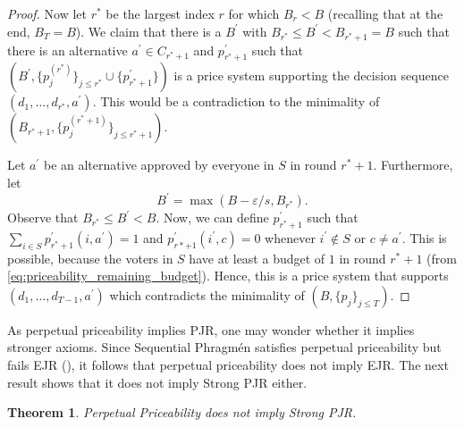 \documentclass[10pt]{scrartcl}
\theoremstyle{plain}
\newtheorem{theorem}{Theorem}[section]
\theoremstyle{definition}
\renewcommand*{\leq}{\leqslant}
\renewcommand{\epsilon}{\varepsilon}
\begin{document}
\begin{proof}
Now let $r^*$ be the largest index $r$ for which $B_r < B$ (recalling that at the end, $B_T = B$). We claim that there is a $B^{\prime}$ with $B_{r^*} \leq B^{\prime}<B_{r^*+1} = B$ such that there is an alternative $a^{\prime} \in C_{r^* + 1}$ and $p_{r^{*}+1}^{\prime}$ such that $ (B^{\prime}, \{p_j^{(r^*)} \}_{j \leq r^*} \cup \{p_{r^* + 1}^{\prime} \}) $ is a price system supporting the decision sequence $ (d_1, \ldots, d_{r^*}, a^{\prime} )$. This would be a contradiction to the minimality of $ (B_{r^* + 1}, \{p_j^{(r^* + 1)} \}_{j \leq r^*+1} )$.

Let $a^{\prime}$ be an alternative approved by everyone in $S$ in round $r^*+1$. Furthermore, let 
\[
 B^{\prime}= \max  (B - \epsilon / s, B_{r^*} ).
\]
Observe that $B_{r^*} \leq B^{\prime} < B$. 
Now, we can define $p_{r^* + 1}^{\prime}$ such that $\sum_{i \in S} p_{r^*+1}^{\prime} (i, a^{\prime} )=1$ and $p_{r *+1}^{\prime} (i^{\prime}, c )=0$ whenever $i^{\prime} \notin S$ or $c \neq a^{\prime}$. This is possible, because the voters in $S$ have at least a budget of $1$ in round $r^*+1$ (from  \eqref{eq:priceability_remaining_budget}). Hence, this is a price system that supports $ (d_1, \ldots, d_{T-1}, a^{\prime} )$ which contradicts the minimality of $ (B, \{p_j \}_{j \leq T} )$.
\end{proof}

As perpetual priceability implies PJR, one may wonder whether it implies stronger axioms. Since Sequential Phragm\'en satisfies perpetual priceability \citep{lacknermaly2023} but fails EJR (), it follows that perpetual priceability does not imply EJR. The next result shows that it does not imply Strong PJR either.


\begin{theorem}\label{thm:priceability_does_not_imply_some_rounds}
    Perpetual Priceability does not imply Strong PJR.
\end{theorem}
\end{document}

